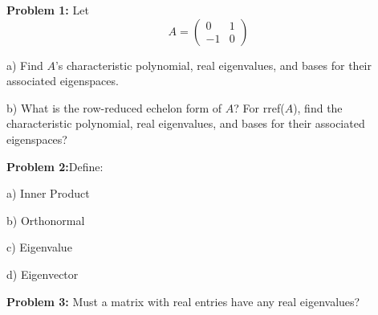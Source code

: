 \documentclass[a4paper,12pt]{article}
\begin{document}
{\Large{\bf Problem 1:}} Let \[ A= \left( \begin{array}{ccc}0 & 1 \\ -1 & 0\end{array} \right)\]

a) Find $A$'s characteristic polynomial, real eigenvalues, and bases for their associated eigenspaces.

b) What is the row-reduced echelon form of $A$? For rref($A$), find the characteristic polynomial, real eigenvalues, and bases for their associated eigenspaces?

\shunt

{\Large{\bf Problem 2:}}Define:

a) Inner Product

b) Orthonormal

c) Eigenvalue

d) Eigenvector

\shunt

{\Large{\bf Problem 3:}} Must a matrix with real entries have any real eigenvalues? 
\end{document}
